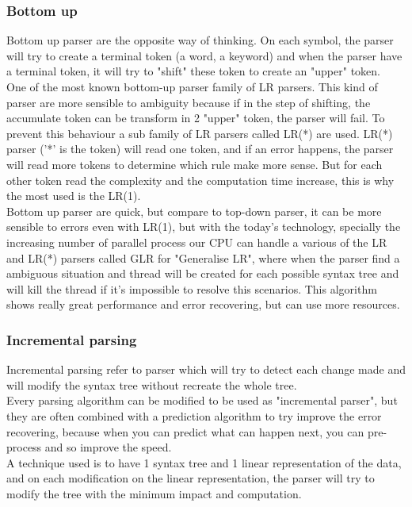 \subsubsection{Bottom up}
Bottom up parser are the opposite way of thinking. On each symbol, the parser will try to create a terminal token (a word, a keyword) and when the parser have a terminal token, it will try to "shift" these token to create an "upper" token\cite{knuth1971top}\cite{grune2008parsing}.
\\One of the most known bottom-up parser family of LR parsers. This kind of parser are more sensible to ambiguity because if in the step of shifting, the accumulate token can be transform in 2 "upper" token, the parser will fail. To prevent this behaviour a sub family of LR parsers called LR(*) are used. LR(*) parser ('*' is the token) will read one token, and if an error happens, the parser will read  more tokens to determine which rule make more sense. But for each other token read the complexity and the computation time increase, this is why the most used is the LR(1).
\\Bottom up parser are quick, but compare to top-down parser, it can be more sensible to errors even with LR(1), but with the today's technology, specially the increasing number of parallel process our CPU can handle a various of the LR and LR(*) parsers called GLR for "Generalise LR", where when the parser find a ambiguous situation and thread will be created for each possible syntax tree\cite{panopticoncentral_2009} and will kill the thread if it's impossible to resolve this scenarios. This algorithm shows really great performance and error recovering, but can use more resources.

\subsubsection{Incremental parsing}
Incremental parsing refer to parser which will try to detect each change made and will modify the syntax tree without recreate the whole tree.\cite{grune2008parsing}\cite{horspool1990incremental}
\\Every parsing algorithm can be modified to be used as "incremental parser", but they are often combined with a prediction algorithm to try improve the error recovering, because when you can predict what can happen next, you can pre-process and so improve the speed.
\\A technique used is to have 1 syntax tree and 1 linear representation of the data, and on each modification on the linear representation, the parser will try to modify the tree with the minimum impact and computation.
